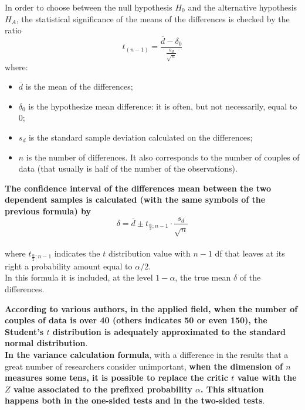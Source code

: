\begin{frame}
  \vspace*{.25cm}
  In order to choose between the null hypothesis $H_0$ and the alternative hypothesis $H_A$, the statistical significance of the means of the differences is checked by the ratio
  $$t_{(n-1)}=\frac{\overline{d} - \delta_0}{\frac{s_d}{\sqrt{n}}}$$
  where:\\
  \begin{itemize}
    \item $ \overline{d} $ is the mean of the differences;
    \item $ \delta_0 $ is the hypothesize mean difference: it is often, but not necessarily, equal to 0;
    \item $ s_d $ is the standard sample deviation calculated on the differences;
    \item $ n $ is the number of differences. It also corresponds to the number of couples of data (that usually is half of the number of the observations).
  \end{itemize}
\end{frame}

\begin{frame}
  \vspace*{.25cm}
  \textbf{The confidence interval of the differences mean between the two dependent samples is calculated (with the same symbols of the previous formula) by}
  $$ \delta = \overline{d}\pm t_{\frac{\alpha}{2};n-1}\cdot \frac{s_d}{\sqrt{n}}$$\\
  where $t_{\frac{\alpha}{2};n-1}$ indicates the $ t $ distribution value with $ n - 1 $ df that leaves at its right a probability amount equal to $ \alpha/ 2$.\\
  \vspace*{.25cm}
  In this formula it is included, at the level $ 1-\alpha $, the true mean $ \delta $ of the differences.\\
\end{frame}

\begin{frame}
  \vspace*{.25cm}
  \textbf{According to various authors, in the applied field, when the number of couples of data is over 40 (others indicates 50 or even 150), the Student's $ t $ distribution is adequately approximated to the standard normal distribution}.\\
  \vspace*{.5cm}
  \textbf{In the variance calculation formula}, with a difference in the results that a great number of researchers consider unimportant, \textbf{when the dimension of {\boldmath$ n $} measures some tens, it is possible to replace the critic {\boldmath$ t $} value with the {\boldmath$ Z $} value associated to the prefixed probability   {\boldmath$\alpha$}. This situation happens both in the one-sided tests and in the two-sided tests}.
\end{frame}

